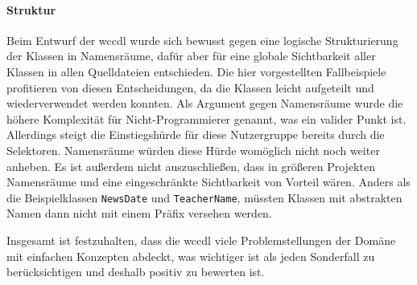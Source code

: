     \paragraph*{Struktur}
    Beim Entwurf der \gls{wccdl} wurde sich bewusst gegen
    eine logische Strukturierung der Klassen in Namensräume,
    dafür aber für eine globale Sichtbarkeit aller Klassen
    in allen Quelldateien entschieden.
    Die hier vorgestellten Fallbeispiele profitieren von diesen Entscheidungen,
    da die Klassen leicht aufgeteilt und wiederverwendet werden konnten.
    Als Argument gegen Namensräume wurde die höhere Komplexität für
    Nicht-Programmierer genannt, was ein valider Punkt ist.
    Allerdings steigt die Einstiegshürde für diese Nutzergruppe bereits
    durch die Selektoren. Namensräume würden diese Hürde womöglich nicht noch weiter anheben.
    Es ist außerdem nicht auszuschließen, dass in größeren Projekten
    Namensräume und eine eingeschränkte Sichtbarkeit von Vorteil wären.
    Anders als die Beispielklassen \texttt{NewsDate} und \texttt{TeacherName},
    müssten Klassen mit abstrakten Namen dann nicht mit einem Präfix versehen werden.

    Insgesamt ist festzuhalten, dass die \gls{wccdl} viele Problemstellungen der Domäne
    mit einfachen Konzepten abdeckt, was wichtiger ist als jeden Sonderfall zu berücksichtigen
    und deshalb positiv zu bewerten ist.